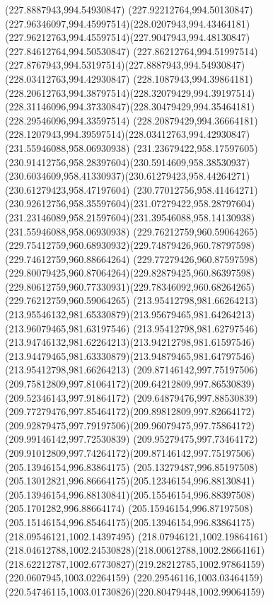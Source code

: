 {{		\moveto(227.8887943,994.54930847)
		\curveto(227.92212764,994.50130847)(227.96346097,994.45997514)(228.0207943,994.43464181)
		\curveto(227.96212763,994.45597514)(227.9047943,994.48130847)(227.84612764,994.50530847)
		\curveto(227.86212764,994.51997514)(227.8767943,994.53197514)(227.8887943,994.54930847)
		\moveto(228.03412763,994.42930847)
		\curveto(228.1087943,994.39864181)(228.20612763,994.38797514)(228.32079429,994.39197514)
		\curveto(228.31146096,994.37330847)(228.30479429,994.35464181)(228.29546096,994.33597514)
		\curveto(228.20879429,994.36664181)(228.1207943,994.39597514)(228.03412763,994.42930847)
		\moveto(231.55946088,958.06930938)
		\curveto(231.23679422,958.17597605)(230.91412756,958.28397604)(230.5914609,958.38530937)
		\curveto(230.6034609,958.41330937)(230.61279423,958.44264271)(230.61279423,958.47197604)
		\curveto(230.77012756,958.41464271)(230.92612756,958.35597604)(231.07279422,958.28797604)
		\curveto(231.23146089,958.21597604)(231.39546088,958.14130938)(231.55946088,958.06930938)
		\moveto(229.76212759,960.59064265)
		\curveto(229.75412759,960.68930932)(229.74879426,960.78797598)(229.74612759,960.88664264)
		\curveto(229.77279426,960.87597598)(229.80079425,960.87064264)(229.82879425,960.86397598)
		\curveto(229.80612759,960.77330931)(229.78346092,960.68264265)(229.76212759,960.59064265)
		\moveto(213.95412798,981.66264213)
		\curveto(213.95546132,981.65330879)(213.95679465,981.64264213)(213.96079465,981.63197546)
		\curveto(213.95412798,981.62797546)(213.94746132,981.62264213)(213.94212798,981.61597546)
		\curveto(213.94479465,981.63330879)(213.94879465,981.64797546)(213.95412798,981.66264213)
		\moveto(209.87146142,997.75197506)
		\curveto(209.75812809,997.81064172)(209.64212809,997.86530839)(209.52346143,997.91864172)
		\curveto(209.64879476,997.88530839)(209.77279476,997.85464172)(209.89812809,997.82664172)
		\curveto(209.92879475,997.79197506)(209.96079475,997.75864172)(209.99146142,997.72530839)
		\curveto(209.95279475,997.73464172)(209.91012809,997.74264172)(209.87146142,997.75197506)
		\moveto(205.13946154,996.83864175)
		\curveto(205.13279487,996.85197508)(205.13012821,996.86664175)(205.12346154,996.88130841)
		\curveto(205.13946154,996.88130841)(205.15546154,996.88397508)(205.1701282,996.88664174)
		\curveto(205.15946154,996.87197508)(205.15146154,996.85464175)(205.13946154,996.83864175)
		\moveto(218.09546121,1002.14397495)
		\curveto(218.07946121,1002.19864161)(218.04612788,1002.24530828)(218.00612788,1002.28664161)
		\curveto(218.62212787,1002.67730827)(219.28212785,1002.97864159)(220.0607945,1003.02264159)
		\curveto(220.29546116,1003.03464159)(220.54746115,1003.01730826)(220.80479448,1002.99064159)
}}
